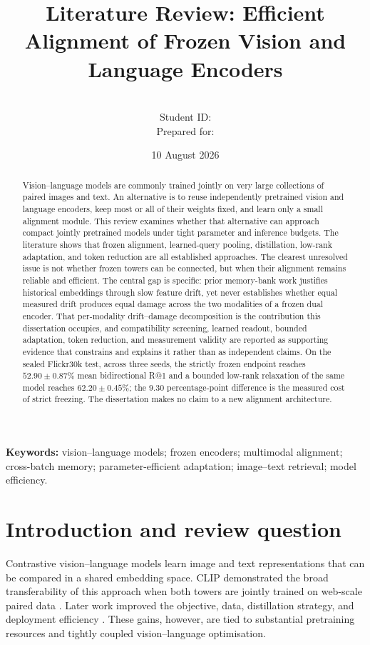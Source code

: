 \documentclass[11pt,a4paper]{article}
\title{\textbf{Literature Review: Efficient Alignment of Frozen Vision and Language Encoders}}
\author{\studentname\\Student ID: \studentid\\Prepared for: \supervisorname}
\date{10 August 2026}
\begin{document}
\maketitle

\begin{abstract}
Vision--language models are commonly trained jointly on very large collections
of paired images and text. An alternative is to reuse independently pretrained
vision and language encoders, keep most or all of their weights fixed, and learn
only a small alignment module. This review examines whether that alternative can
approach compact jointly pretrained models under tight parameter and inference
budgets. The literature shows that frozen alignment, learned-query pooling,
distillation, low-rank adaptation, and token reduction are all established
approaches. The clearest unresolved issue is not whether frozen towers
can be connected, but when their alignment remains reliable and efficient. The
central gap is specific: prior memory-bank work justifies historical embeddings
through slow feature drift, yet never establishes whether equal measured drift
produces equal damage across the two modalities of a frozen dual encoder. That
per-modality drift--damage decomposition is the contribution this dissertation
occupies, and compatibility screening, learned readout, bounded adaptation,
token reduction, and measurement validity are reported as supporting evidence
that constrains and explains it rather than as independent claims. On the sealed
Flickr30k test, across three seeds, the strictly frozen endpoint reaches
$52.90 \pm 0.87\%$ mean bidirectional R@1 and a bounded low-rank relaxation of
the same model reaches $62.20 \pm 0.45\%$; the $9.30$ percentage-point
difference is the measured cost of strict freezing. The dissertation makes no
claim to a new alignment architecture.
\end{abstract}

\textbf{Keywords:} vision--language models; frozen encoders; multimodal
alignment; cross-batch memory; parameter-efficient adaptation; image--text
retrieval; model efficiency.

\tableofcontents
\newpage

\section{Introduction and review question}

Contrastive vision--language models learn image and text representations that
can be compared in a shared embedding space. CLIP demonstrated the broad
transferability of this approach when both towers are jointly trained on
web-scale paired data \cite{radford2021clip}. Later work improved the objective,
data, distillation strategy, and deployment efficiency
\cite{zhai2023siglip,vasu2024mobileclip,faghri2025mobileclip2}. These gains,
however, are tied to substantial pretraining resources and tightly coupled
vision--language optimisation.
\end{document}
